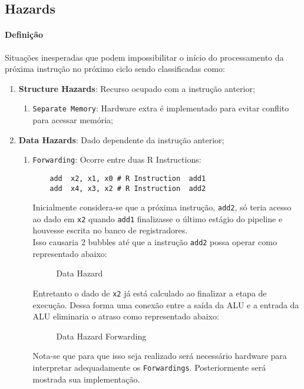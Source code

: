 \documentclass{article}
\begin{document}
\subsection{Hazards}
\paragraph{Definição}Situações inesperadas que podem impossibilitar o início do processamento da próxima instrução no próximo ciclo sendo classificadas como:
\begin{enumerate}[rightmargin = \leftmargin]
    \item \textbf{Structure Hazards}: Recurso ocupado com a instrução anterior;
    \begin{enumerate}[rightmargin = \leftmargin]
        \item \texttt{Separate Memory}: Hardware extra é implementado para evitar conflito para acessar memória;
    \end{enumerate}

    \item \textbf{Data Hazards}: Dado dependente da instrução anterior;
    \begin{enumerate}[rightmargin = \leftmargin]
        \item \texttt{Forwarding}: Ocorre entre duas R Instructions:
        \begin{scriptsize}
            \myStyleRISCV
            \begin{lstlisting}
    add  x2, x1, x0 # R Instruction  add1
    add  x4, x3, x2 # R Instruction  add2
            \end{lstlisting}
        \end{scriptsize}
        Inicialmente considera-se que a próxima instrução, \texttt{add2}, só teria acesso ao dado em \texttt{x2} quando \texttt{add1} finalizasse o último estágio do pipeline e houvesse escrita no banco de registradores.\\

        \noindent Isso causaria 2 bubbles até que a instrução \texttt{add2} possa operar como representado abaixo:
        \begin{figure}[H]
            \centering
            \caption{Data Hazard}
            \label{hazardData}
        \end{figure}
        
        Entretanto o dado de \texttt{x2} já está calculado ao finalizar a etapa de execução. Dessa forma uma conexão entre a saída da ALU e a entrada da ALU eliminaria o atraso como representado abaixo:
        \begin{figure}[H]
            \centering
            \caption{Data Hazard Forwarding}
            \label{hazardDataForwarding}
        \end{figure}
        Nota-se que para que isso seja realizado será necessário hardware para interpretar adequadamente os \texttt{Forwardings}. Posteriormente será mostrada sua implementação.


\end{enumerate}
\end{enumerate}
\end{document}

